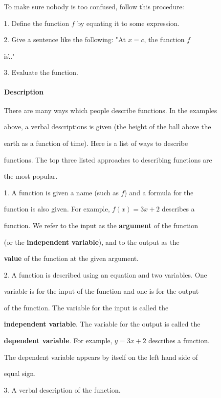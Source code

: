 To make sure nobody is too confused, follow this procedure:



1.  Define the function $f$ by equating it to some expression.

2.  Give a sentence like the following: "At $x=c$, the function $f$

    is\..."

3.  Evaluate the function.



\paragraph{Description}



There are many ways which people describe functions. In the examples

above, a verbal descriptions is given (the height of the ball above the

earth as a function of time). Here is a list of ways to describe

functions. The top three listed approaches to describing functions are

the most popular.



1.  A function is given a name (such as $f$) and a formula for the

    function is also given. For example, $f(x)=3x+2$ describes a

    function. We refer to the input as the \textbf{argument} of the function

    (or the \textbf{independent variable}), and to the output as the

    \textbf{value} of the function at the given argument.

2.  A function is described using an equation and two variables. One

    variable is for the input of the function and one is for the output

    of the function. The variable for the input is called the

    \textbf{independent variable}. The variable for the output is called the

    \textbf{dependent variable}. For example, $y=3x+2$ describes a function.

    The dependent variable appears by itself on the left hand side of

    equal sign.

3.  A verbal description of the function.



